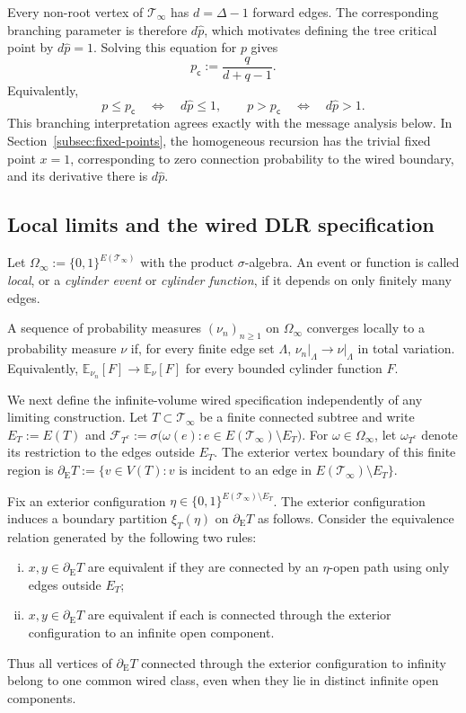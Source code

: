 \documentclass[11pt]{amsart}
\theoremstyle{plain}
\theoremstyle{definition}
\theoremstyle{remark}
\newcommand{\pc}{p_{\mathsf{c}}}
\begin{document}
Every non-root vertex of $\mathcal T_\infty$ has $d=\Delta-1$ forward edges. The corresponding branching parameter is therefore $d\widehat p$, which motivates defining the tree critical point by $d\widehat p=1$. Solving this equation for $p$ gives
\begin{equation}
\label{eq:critical-point}
    \pc
    :=
    \frac{q}{d+q-1}.
\end{equation}
Equivalently,
\[
    p\le\pc
    \quad\Longleftrightarrow\quad
    d\widehat p\le1,
    \qquad
    p>\pc
    \quad\Longleftrightarrow\quad
    d\widehat p>1.
\]
This branching interpretation agrees exactly with the message analysis below. In Section~\ref{subsec:fixed-points}, the homogeneous recursion has the trivial fixed point $x=1$, corresponding to zero connection probability to the wired boundary, and its derivative there is $d\widehat p$.

\subsection{Local limits and the wired DLR specification}
Let $\Omega_\infty:=\{0,1\}^{E(\mathcal T_\infty)}$ with the product $\sigma$-algebra. An event or function is called \emph{local}, or a \emph{cylinder event} or \emph{cylinder function}, if it depends on only finitely many edges.

A sequence of probability measures $(\nu_n)_{n\ge1}$ on $\Omega_\infty$ converges locally to a probability measure $\nu$ if, for every finite edge set $\Lambda$, $\nu_n\vert_\Lambda\longrightarrow\nu\vert_\Lambda$ in total variation. Equivalently, $\mathbb E_{\nu_n}[F]\longrightarrow\mathbb E_\nu[F]$ for every bounded cylinder function $F$.

We next define the infinite-volume wired specification independently of any limiting construction.
Let $T\subset\mathcal T_\infty$ be a finite connected subtree and write $E_T:=E(T)$ and $\mathcal F_{T^c}:=\sigma\bigl(\omega(e):e\in E(\mathcal T_\infty)\setminus E_T\bigr)$. For $\omega\in\Omega_\infty$, let $\omega_{T^c}$ denote its restriction to the edges outside $E_T$. The exterior vertex boundary of this finite region is $\partial_{\mathrm E}T:=\bigl\{v\in V(T):v\text{ is incident to an edge in }E(\mathcal T_\infty)\setminus E_T\bigr\}$.

Fix an exterior configuration $\eta\in\{0,1\}^{E(\mathcal T_\infty)\setminus E_T}$. The exterior configuration induces a boundary partition $\xi_T(\eta)$ on $\partial_{\mathrm E}T$ as follows. Consider the equivalence relation generated by the following two rules:
\begin{enumerate}[(i)]
    \item $x,y\in\partial_{\mathrm E}T$ are equivalent if they are connected by an $\eta$-open path using only edges outside $E_T$;
    \item $x,y\in\partial_{\mathrm E}T$ are equivalent if each is connected through the exterior configuration to an infinite open component.
\end{enumerate}
Thus all vertices of $\partial_{\mathrm E}T$ connected through the exterior configuration to infinity belong to one common wired class, even when they lie in distinct infinite open components.
\end{document}
